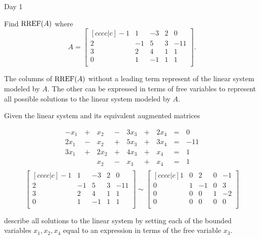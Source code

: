 \begin{applicationActivities}{Day 1}
\begin{activity}
  Find \(\operatorname{RREF}(A)\) where
  \[A=
    \begin{bmatrix}[cccc|c]
      -1 &  1 & -3 &  2 &  0 \\
       2 & -1 &  5 &  3 & -11 \\
       3 &  2 &  4 &  1 &  1 \\
       0 &  1 & -1 &  1 &  1 \\
    \end{bmatrix}
  .\]
\end{activity}

\begin{definition}
  The columns of \(\operatorname{RREF}(A)\) without a leading term represent
   of the linear system modeled by \(A\).
  The other  can be expressed in terms of free
  variables to
  represent all possible solutions to the linear system modeled by \(A\).
\end{definition}

\begin{activity}
  Given the linear system and its equivalent augmented matrices
  \begin{multicols}{2}\noindent
    \begin{alignat*}{5}
      -x_1 &\,+\,&  x_2 &\,-\,&  3x_3 &\,+\,&  2x_4 &\,=\,& 0 \\
      2x_1 &\,-\,&  x_2 &\,+\,&  5x_3 &\,+\,&  3x_4 &\,=\,& -11 \\
      3x_1 &\,+\,& 2x_2 &\,+\,&  4x_3 &\,+\,&   x_4 &\,=\,& 1 \\
           &\, \,&  x_2 &\,-\,&   x_3 &\,+\,&   x_4 &\,=\,& 1 \\
    \end{alignat*}
  \[
    \begin{bmatrix}[cccc|c]
      -1 &  1 & -3 &  2 &  0 \\
       2 & -1 &  5 &  3 & -11 \\
       3 &  2 &  4 &  1 &  1 \\
       0 &  1 & -1 &  1 &  1 \\
    \end{bmatrix}\sim
    \begin{bmatrix}[cccc|c]
       1 &  0 &  2 &  0 & -1 \\
       0 &  1 & -1 &  0 &  3 \\
       0 &  0 &  0 &  1 & -2 \\
       0 &  0 &  0 &  0 &  0 \\
    \end{bmatrix}
  \]
  \end{multicols}
  describe all solutions to the linear system by setting each of the
  bounded variables \(x_1,x_2,x_4\) equal to an expression in terms
  of the free variable \(x_3\).
\end{activity}


\end{applicationActivities}
